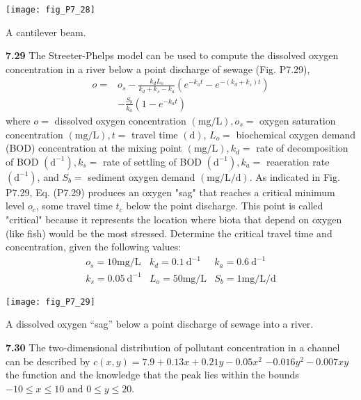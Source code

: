 \documentclass[../main.tex]{subfiles}
\begin{document}
\begin{multicols}{2}
	\begin{center}
	\texttt{[image: fig\_P7\_28]}

	\textsf{A cantilever beam.}
	\end{center}

	\noindent \textbf{7.29} The Streeter-Phelps model can be used to compute the dissolved oxygen concentration in a river below a point discharge of sewage (Fig. P7.29),
	$$
	\begin{aligned}
	o=& o_{s}-\frac{k_{d} L_{o}}{k_{d}+k_{s}-k_{a}}\left(e^{-k_{a} t}-e^{-\left(k_{d}+k_{s}\right) t}\right) \\
	&-\frac{S_{b}}{k_{a}}\left(1-e^{-k_{a} t}\right)
	\end{aligned}
	$$
	where $o=$ dissolved oxygen concentration $(\mathrm{mg} / \mathrm{L}), o_{s}=$ oxygen saturation concentration $(\mathrm{mg} / \mathrm{L}), t=$ travel time $(\mathrm{d})$, $L_{o}=$ biochemical oxygen demand (BOD) concentration at the mixing point $(\mathrm{mg} / \mathrm{L}), k_{d}=$ rate of decomposition of BOD $\left(\mathrm{d}^{-1}\right), k_{s}=$ rate of settling of BOD $\left(\mathrm{d}^{-1}\right), k_{a}=$ reaeration rate $\left(\mathrm{d}^{-1}\right)$, and $S_{b}=$ sediment oxygen demand $(\mathrm{mg} / \mathrm{L} / \mathrm{d})$.
	As indicated in Fig. P7.29, Eq. (P7.29) produces an oxygen "sag" that reaches a critical minimum level $o_{c}$, some travel time $t_{c}$ below the point discharge. This point is called "critical" because it represents the location where biota that depend on oxygen (like fish) would be the most stressed. Determine the critical travel time and concentration, given the following values:
	$$
	\begin{array}{lll}
	o_{s}=10 \mathrm{mg} / \mathrm{L} & k_{d}=0.1 \mathrm{~d}^{-1} & k_{a}=0.6 \mathrm{~d}^{-1} \\
	k_{s}=0.05 \mathrm{~d}^{-1} & L_{o}=50 \mathrm{mg} / \mathrm{L} & S_{b}=1 \mathrm{mg} / \mathrm{L} / \mathrm{d}
	\end{array}
	$$

	\begin{center}
	\texttt{[image: fig\_P7\_29]}
	
	\textsf{A dissolved oxygen “sag” below a point discharge of
	sewage into a river.}
	\end{center}

	\noindent \textbf{7.30} The two-dimensional distribution of pollutant concentration in a channel can be described by
	$c(x, y)=7.9+0.13 x+0.21 y-0.05 x^{2}$ $-0.016 y^{2}-0.007 x y$ the function and the knowledge that the peak lies within the bounds $-10 \leq x \leq 10$ and $0 \leq y \leq 20$.
	

\end{multicols}
\end{document}
